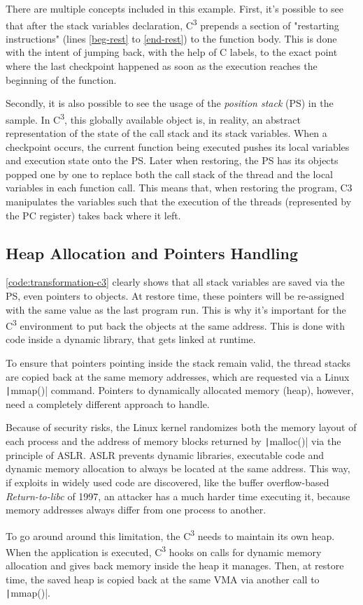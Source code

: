There are multiple concepts included in this example. First, it's possible to see that after the stack variables declaration, C\textsuperscript{3} prepends a section of "restarting instructions" (lines \ref{beg-rest} to \ref{end-rest}) to the function body. This is done with the intent of jumping back, with the help of C labels, to the exact point where the last checkpoint happened as soon as the execution reaches the beginning of the function. 

Secondly, it is also possible to see the usage of the \textit{position stack} (PS) in the sample. In C\textsuperscript{3}, this globally available object is, in reality, an abstract representation of the state of the call stack and its stack variables. When a checkpoint occurs, the current function being executed pushes its local variables and execution state onto the PS. Later when restoring, the PS has its objects popped one by one to replace both the call stack of the thread and the local variables in each function call. This means that, when restoring the program, C3 manipulates the variables such that the execution of the threads (represented by the \gls{PC} register) takes back where it left.

\subsection*{Heap Allocation and Pointers Handling}
\autoref{code:transformation-c3} clearly shows that all stack variables are saved via the PS, even pointers to objects. At restore time, these pointers will be re-assigned with the same value as the last program run. This is why it's important for the C\textsuperscript{3} environment to put back the objects at the same address. This is done with code inside a dynamic library, that gets linked at runtime. 

To ensure that pointers pointing inside the stack remain valid, the thread stacks are copied back at the same memory addresses, which are requested via a Linux \texttt|mmap()| command. Pointers to dynamically allocated memory (heap), however, need a completely different approach to handle. 

Because of security risks, the Linux kernel randomizes both the memory layout of each process and the address of memory blocks returned by \texttt|malloc()| via the principle of \gls{ASLR}. ASLR prevents dynamic libraries, executable code and dynamic memory allocation to always be located at the same address. This way, if exploits in widely used code are discovered, like the buffer overflow-based \textit{Return-to-libc} of 1997\cite{online:libc-attack}, an attacker has a much harder time executing it, because memory addresses always differ from one process to another.

To go around around this limitation, the C\textsuperscript{3} needs to maintain its own heap. When the application is executed, C\textsuperscript{3} hooks on calls for dynamic memory allocation and gives back memory inside the heap it manages. Then, at restore time, the saved heap is copied back at the same \gls{VMA} via another call to \texttt|mmap()|.
